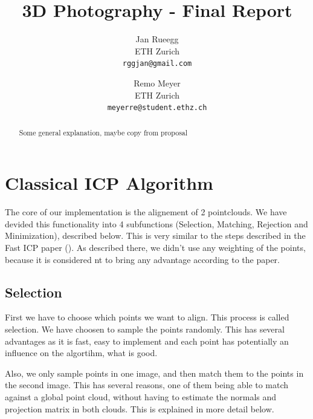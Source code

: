 \documentclass[10pt,twocolumn,letterpaper]{article}
\begin{document}
\title{3D Photography - Final Report}

\author{Jan Rueegg\\
ETH Zurich\\
{\tt\small rggjan@gmail.com}
\and
Remo Meyer\\
ETH Zurich\\
{\tt\small meyerre@student.ethz.ch}
}

\maketitle
\thispagestyle{empty}

\begin{abstract}
Some general explanation, maybe copy from proposal %
\end{abstract}

\section{Classical ICP Algorithm}
The core of our implementation is the alignement of 2 pointclouds. 
We have devided this functionality into 4 subfunctions (Selection, Matching, Rejection and Minimization), described below. This is very
similar to the steps described in the Fast ICP paper (\cite{fasticp}). As described there, we didn't use any weighting of the points,
because it is considered nt to bring any advantage according to the paper.

\subsection{Selection}
First we have to choose which points we want to align. This process is called selection. 
We have choosen to sample the points randomly. 
This has several advantages as it is fast, easy to implement and each point has potentially an influence on the algortihm, what is good.

Also, we only sample points in one image, and then match them to the points in the second image. This has several reasons, one of them
being able to match against a global point cloud, without having to estimate the normals and projection matrix in both clouds.
This is explained in more detail below.
\end{document}
